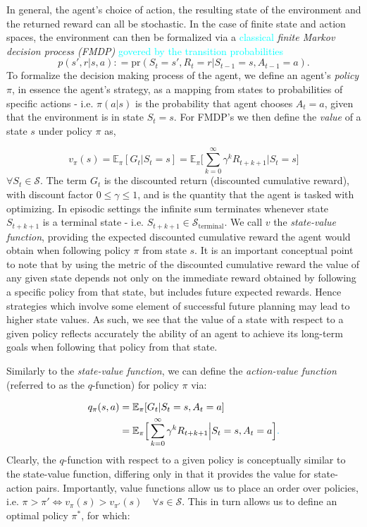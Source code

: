 \documentclass[twocolumn,preprintnumbers,amsmath,amssymb,notitlepage,nofootinbib,longbibliography,superscriptaddress,aps,pra,10pt]{revtex4-1}
\newcommand{\defeq}{\mathrel{\mathop:}=}
\newcommand{\je}[1]{\textcolor{cyan}{#1}}
\begin{document}
	In general, the agent's choice of action, the resulting state of the environment and the returned reward can all be stochastic. In the case of finite state and action spaces, the environment can then be formalized via a  \je{classical}  \emph{finite Markov decision process (FMDP)} \je{govered by the transition probabilities}
	\begin{equation}
		p(s',r|s,a) \defeq \mathrm{pr}(S_t = s',R_t = r|S_{t-1} = s, A_{t-1} = a).
	\end{equation}
	To formalize the decision making process of the agent, we define an agent's \textit{policy} $\pi$, in essence the agent's strategy, as a mapping from states to probabilities of specific actions - i.e. $\pi(a|s)$ is the probability that agent chooses $A_t = a$, given that the environment is in state $S_t = s$.
	For FMDP's we then define the \textit{value} of a state $s$ under policy $\pi$ as,

	\begin{equation}
		v_{\pi}(s) = \mathbb{E}_{\pi}[G_t|S_t = s]  = \mathbb{E}_{\pi} \Big[\sum_{k = 0}^{\infty}\gamma^k R_{t+k+1}\Big| S_t = s \Big] 
	\end{equation}
	$\forall S_t \in \mathcal{S}$. 
	The term $G_t$ is the discounted return (discounted cumulative reward), with discount factor $0 \leq \gamma \leq 1$, and is the quantity that the agent is tasked with optimizing.
	In episodic settings the infinite sum terminates whenever state $S_{t+k+1}$ is a terminal state - i.e. $S_{t+k+1} \in \mathcal{S}_{\mathrm{terminal}}$.
	We call $v$ the \textit{state-value function}, providing the expected discounted cumulative reward the agent would obtain when following policy $\pi$ from state $s$.
	It is an important conceptual point to note that by using the metric of the discounted cumulative reward the value of any given state depends not only on the immediate reward obtained by following a specific policy from that state, but includes future expected rewards.
	Hence strategies which involve some element of successful future planning may lead to higher state values.
	As such, we see that the value of a state with respect to a given policy reflects accurately the ability of an agent to achieve its long-term goals when following that policy from that state. 

	Similarly to the \textit{state-value function}, we can define the \textit{action-value function}  (referred to as the $q$-function) for policy $\pi$ via:

	\begin{align}
		q_{\pi}(s,a) &= \mathbb{E}_{\pi}[G_t|S_t = s, A_t = a]  \\
		& = \mathbb{E}_{\pi} \Big[\sum_{k = 0}^{\infty}\gamma^k R_{t+k+1}\Big| S_t = s, A_t = a \Big] \je{.}
	\end{align}
	Clearly, the $q$-function with respect to a given policy is conceptually similar to the state-value function, differing only in that it provides the value for state-action pairs.
	Importantly, value functions allow us to place an order over policies, i.e. $\pi > \pi' \iff v_{\pi}(s) > v_{\pi'}(s)\quad \forall s \in \mathcal{S} $.
	This in turn allows us to define an optimal policy $\pi^*$, for which:
\end{document}
